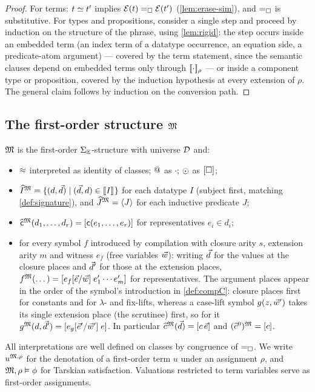 \begin{proof}
For terms: $t \simeq t'$ implies $\mathcal{E}(t) =_{\square} \mathcal{E}(t')$
(\cref{lem:erase-sim}), and $=_{\square}$ is substitutive.  For types and
propositions, consider a single step and proceed by induction on the
structure of the phrase, using \cref{lem:rigid}: the step occurs inside
an embedded term (an index term of a datatype occurrence, an equation
side, a predicate-atom argument) --- covered by the term statement,
since the semantic clauses depend on embedded terms only through
$[\![ \cdot ]\!]_\rho$ --- or inside a component type or proposition,
covered by the induction hypothesis at every extension of $\rho$.  The
general claim follows by induction on the conversion path.
\end{proof}

\subsection{The first-order structure \texorpdfstring{$\mathfrak{M}$}{M}}
\label{sec:semantics-model}

\begin{definition}
\label{def:model}
$\mathfrak{M}$ is the first-order $\Sigma_{\mathbb{E}}$-structure with universe $\mathcal{D}$ and:
\begin{itemize}[leftmargin=2em]
\item $\approx$ interpreted as identity of classes; $\mathbin{@}$ as $\cdot$;
  $\odot$ as $[\square]$;
\item $\widehat{I}^{\mathfrak{M}} = \{ (d, \vec{d}) \mid (\vec{d}, d) \in
  [\![ I ]\!]_{} \}$ for each datatype $I$ (subject first, matching
  \cref{def:signature}), and $\widehat{J}^{\mathfrak{M}} = \langle J \rangle$ for each
  inductive predicate $J$;
\item $\widehat{\mathsf{c}}^{\mathfrak{M}}(d_1, \dots, d_r) = [\mathsf{c}(e_1,
  \dots, e_r)]$ for representatives $e_i \in d_i$;
\item for every symbol $f$ introduced by compilation with closure arity
  $s$, extension arity $m$ and witness $e_f$ (free variables $\vec{w}$):
  writing $\vec{d}$ for the values at the closure places and $\vec{d}'$
  for those at the extension places,
  $f^{\mathfrak{M}}(\dots) = [e_f[\vec{e}/\vec{w}]\;
  e'_1 \cdots e'_m]$ for representatives.  The argument places appear
  in the order of the symbol's introduction in \cref{def:compC}:
  closure places first for constants and for $\lambda$- and fix-lifts,
  whereas a case-lift symbol $g(z, \vec{w}')$ takes its single
  extension place (the scrutinee) first, so for it
  $g^{\mathfrak{M}}(d, \vec{d}') =
  [e_g[\vec{e}'/\vec{w}']\;e]$.  In particular
  $\widehat{c}^{\mathfrak{M}}(\vec{d}) = [c\,\vec{e}]$ and $(\widehat{c}^0)^{\mathfrak{M}} =
  [c]$.
\end{itemize}
All interpretations are well defined on classes by congruence of
$=_{\square}$.  We write $u^{\mathfrak{M},\rho}$ for the denotation of a first-order
term $u$ under an assignment $\rho$, and $\mathfrak{M}, \rho \vDash \phi$ for
Tarskian satisfaction.  Valuations restricted to term variables serve as
first-order assignments.
\end{definition}

